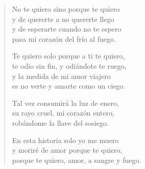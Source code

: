 \documentclass[12pt]{article}
\begin{document}
\clearpage
{}
\begin{verse}

No te quiero sino porque te quiero\\
y de quererte a no quererte llego\\
y de esperarte cuando no te espero\\
pasa mi corazón del frío al fuego.  

Te quiero solo porque a ti te quiero,\\
te odio sin fin, y odiándote te ruego,\\
y la medida de mi amor viajero\\
es no verte y amarte como un ciego.  

Tal vez consumirá la luz de enero,\\
su rayo cruel, mi corazón entero,\\
robándome la llave del sosiego.  

En esta historia solo yo me muero\\
y moriré de amor porque te quiero,\\
porque te quiero, amor, a sangre y fuego.  

\end{verse}
\end{document}
